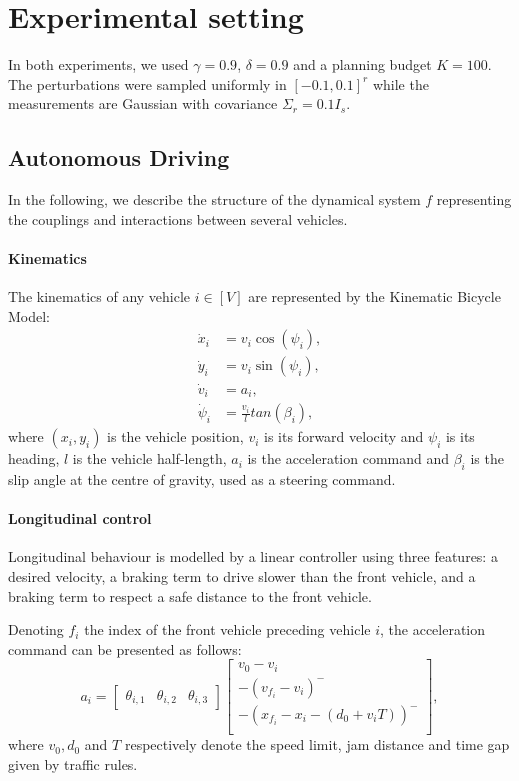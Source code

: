 \documentclass{article}
\begin{document}
\section{Experimental setting}
\label{sec:experimental-setting}

In both experiments, we used $\gamma=0.9$,  $\delta=0.9$ and a planning budget $K=100$. The perturbations were sampled uniformly in $[-0.1, 0.1]^r$ while the measurements are Gaussian with covariance $\Sigma_r = 0.1 I_s$. 

\subsection{Autonomous Driving}

In the following, we describe the structure of the dynamical system $f$ representing the couplings and interactions between several vehicles.

\paragraph{Kinematics}

The kinematics of any vehicle $i\in[V]$ are represented by the Kinematic Bicycle Model:
\begin{align}
	\dot{x}_i &= v_i\cos(\psi_i), \nonumber\\
	\dot{y}_i &= v_i\sin(\psi_i), \nonumber\\
	\dot{v}_i &= a_i, \nonumber\\
	\dot{\psi}_i &= \frac{v_i}{l}tan(\beta_i), \nonumber
\end{align}
where $(x_i, y_i)$ is the vehicle position, $v_i$ is its forward velocity and $\psi_i$ is its heading, $l$ is the vehicle half-length, $a_i$ is the acceleration command and $\beta_i$ is the slip angle at the centre of gravity, used as a steering command.

\paragraph{Longitudinal control}
Longitudinal behaviour is modelled by a linear controller using three features: a desired velocity, a braking term to drive slower than the front vehicle, and a braking term to respect a safe distance to the front vehicle.

Denoting $f_i$ the index of the front vehicle preceding vehicle $i$, the acceleration command can be presented as follows:
\begin{equation*}
	a_i = \begin{bmatrix}
	\theta_{i,1} & \theta_{i,2} & \theta_{i,3}
	\end{bmatrix} \begin{bmatrix}
		v_0 - v_i \\
		-(v_{f_i}-v_i)^- \\
		-(x_{f_i} - x_i - (d_0 + v_iT))^- \\
	\end{bmatrix},
	\label{eq:theta_a}
\end{equation*}
where $v_0, d_0$ and $T$ respectively denote the speed limit, jam distance and time gap given by traffic rules.
\end{document}
